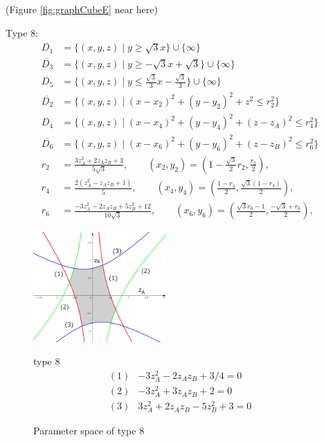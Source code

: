 \documentclass[suppldata, dvipdfmx]{interact}
\theoremstyle{plain}%
\theoremstyle{definition}
\theoremstyle{remark}
\theoremstyle{problemstyle}
\begin{document}
\noindent(Figure \ref{fig:graphCubeE} near here)
\bigskip\par
Type 8:
\begin{align*}
\overline{D_1}&=\{ (x,y,z) \mid y \ge \sqrt{3}x  \} \cup \{ \infty \}\\
\overline{D_3}&=\{(x,y,z) \mid y \ge -\sqrt{3}x + \sqrt{3} \} \cup\{\infty\}\\
\overline{D_5}&=\{(x,y,z) \mid y \le \frac{\sqrt{3}}{3}x - \frac{\sqrt{3}}{3} \} \cup\{\infty\}\\
\overline{D_2}&=\{(x,y,z) \mid (x-x_2)^2+(y-y_2)^2+z^2 \le r_2^2 \} \\
\overline{D_4}&=\{(x,y,z) \mid (x-x_4)^2+(y-y_4)^2+(z-z_A)^2 \le r_4^2 \} \\
\overline{D_6}&=\{(x,y,z) \mid (x-x_6)^2+(y-y_6)^2+(z-z_B)^2 \le r_6^2 \} \\
 r_2 &= \frac{3z_A^2 + 2z_Az_B + 3}{5\sqrt{3}}, \qquad
(x_2, y_2) = \left(1 - \frac{\sqrt{3}}{2}r_2, \frac{r_2}{2}\right),\\
 r_4 &= \frac{2(z_A^2 - z_Az_B + 1)}{5}, \qquad
(x_4, y_4) = \left(\frac{1 - r_4}{2}, \frac{\sqrt{3}(1 - r_4)}{2}\right),\\
 r_6 &= \frac{-3 z_A^2 -2z_Az_B + 5z_B^2 + 12}{10\sqrt{3}}, \qquad
(x_6, y_6) = \left(\frac{\sqrt{3}r_6 - 1}{2}, \frac{-\sqrt{3} + r_6}{2}\right),
\end{align*} 
\begin{figure}[h]
 \begin{minipage}[]{0.5\textwidth}
 \centering
 \includegraphics[width=2in,
 keepaspectratio]{./img/graph/cubeH.jpg}
 \caption{Parameter space of type 8}
 \label{fig:graphCubeH}
 \end{minipage}
 \hspace*{\fill}
 \begin{minipage}[]{0.5\textwidth}
  \centering
  type 8
  \begin{align*}
   (1)& -3z_A^2 - 2z_Az_B + 3/4 = 0\\
   (2)& -3z_A^2 + 3 z_Az_B + 2 = 0\\
   (3)&  3z_A^2 + 2z_Az_B -5z_B^2 + 3 = 0
  \end{align*}
 \end{minipage}
 \hspace*{\fill}
\end{figure}
\end{document}
